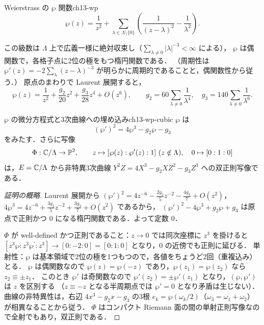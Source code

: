 \begin{mydef}{Weierstrass の $\wp$ 関数}{ch13-wp}
\begin{equation}
  \wp(z) = \frac{1}{z^2} + \sum_{\lambda\in\Lambda\setminus\{0\}}\left(\frac{1}{(z-\lambda)^2}-\frac{1}{\lambda^2}\right).
\end{equation}
\end{mydef}

この級数は $\Lambda$ 上で広義一様に絶対収束し（$\sum_{\lambda\neq0}|\lambda|^{-3}<\infty$ による），
$\wp$ は偶関数で，各格子点に2位の極をもつ楕円関数である．
（周期性は $\wp'(z)=-2\sum_\lambda(z-\lambda)^{-3}$ が明らかに周期的であることと，偶関数性から従う．）
原点のまわりで Laurent 展開すると，
\begin{equation}
  \wp(z) = \frac{1}{z^2} + \frac{g_2}{20}z^2 + \frac{g_3}{28}z^4 + O(z^6),\qquad
  g_2 = 60\sum_{\lambda\neq0}\frac{1}{\lambda^4},\quad g_3 = 140\sum_{\lambda\neq0}\frac{1}{\lambda^6}.
\end{equation}

\begin{mythm}{$\wp$ の微分方程式と3次曲線への埋め込み}{ch13-wp-cubic}
$\wp$ は
\begin{equation}
  (\wp')^2 = 4\wp^3 - g_2\wp - g_3
  \label{eq:ch13-wp-ode}
\end{equation}
をみたす．さらに写像
\begin{equation}
  \Phi: \C/\Lambda\to\PP^2,\qquad z\mapsto [\wp(z):\wp'(z):1]\ (z\notin\Lambda),\quad 0\mapsto[0:1:0]
\end{equation}
は，$E=\mathbb{C}/\Lambda$ から非特異3次曲線 $Y^2Z = 4X^3 - g_2XZ^2 - g_3Z^3$ への双正則写像である．
\end{mythm}

\begin{proof}[証明の概略]
Laurent 展開から $(\wp')^2 = 4z^{-6} - \tfrac{2g_2}{5}z^{-2}-\tfrac{4g_3}{7}+O(z^2)$，
$4\wp^3 = 4z^{-6}+\tfrac{3g_2}{5}z^{-2}+\tfrac{3g_3}{7}+O(z^2)$ であるから，
$(\wp')^2-4\wp^3+g_2\wp+g_3$ は原点で正則かつ $0$ になる楕円関数である．よって定数 $0$．

$\Phi$ が well-defined かつ正則であること：$z\to0$ では同次座標に $z^3$ を掛けると $[z^3\wp:z^3\wp^{\prime}:z^3]\to[0:-2:0]=[0:1:0]$ となり，$0$ の近傍でも正則に延びる．
単射性：$\wp$ は基本領域で2位の極を1つもつので，各値をちょうど2回（重複込み）とる．
$\wp$ は偶関数なので $\wp(z)=\wp(-z)$ であり，$\wp(z_1)=\wp(z_2)$ なら $z_2\equiv\pm z_1$．
このとき $\wp'$ は奇関数なので $\wp'(z_2)=\pm\wp'(z_1)$ となり，$(\wp,\wp')$ は $z$ を区別する
（$z\equiv-z$ となる半周期点では $\wp'=0$ となり矛盾は生じない）．
曲線の非特異性は，右辺 $4x^3-g_2x-g_3$ の3根 $e_k=\wp(\omega_k/2)$（$\omega_3=\omega_1+\omega_2$）が相異なることから従う．
$\Phi$ はコンパクト Riemann 面の間の単射正則写像なので全射でもあり，双正則である．
\end{proof}

